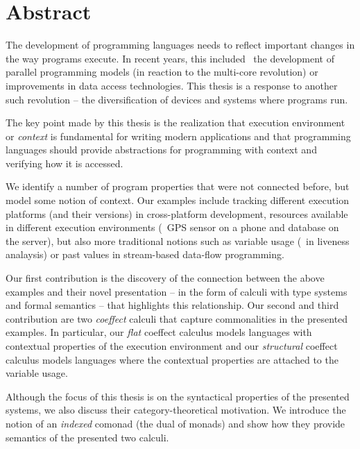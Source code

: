 
\begingroup
\let\clearpage\relax
\let\cleardoublepage\relax
\let\cleardoublepage\relax

\chapter*{Abstract} %
The development of programming languages needs to reflect important changes in the way
programs execute. In recent years, this included \eg~the development of parallel programming 
models (in reaction to the multi-core revolution) or improvements in data access technologies. 
This thesis is a response to another such revolution -- the diversification of devices and 
systems where programs run. 

The key point made by this thesis is the realization that execution environment or
\emph{context} is fundamental for writing modern applications and that programming 
languages should provide abstractions for programming with context and verifying how 
it is accessed. 

We identify a number of program properties that were not connected before, but model some notion 
of context. Our examples include tracking different execution platforms (and their versions) 
in cross-platform development, resources available in different execution environments (\eg~GPS
sensor on a phone and database on the server), but also more traditional notions such as 
variable usage (\eg~in liveness analaysis) or past values in stream-based data-flow programming.

Our first contribution is the discovery of the connection between the above examples and
their novel presentation -- in the form of calculi with type systems and formal semantics --
that highlights this relationship. Our second and third contribution are two \emph{coeffect}
calculi that capture commonalities in the presented examples. In particular, our 
\emph{flat} coeffect calculus models languages with contextual properties of the execution 
environment and our \emph{structural} coeffect calculus models languages where the contextual
properties are attached to the variable usage.

Although the focus of this thesis is on the syntactical properties of the presented 
systems, we also discuss their category-theoretical motivation. We introduce the notion of
an \emph{indexed} comonad (the dual of monads) and show how they provide semantics of the
presented two calculi. 

\endgroup			

\vfill